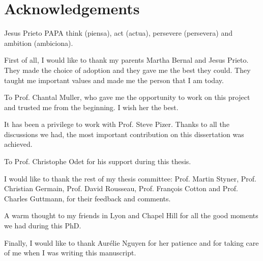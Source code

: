 \chapter*{Acknowledgements}

\begin{chapquote}{Jesus Prieto}
  PAPA think (piensa), act (actua), persevere (persevera) and ambition (ambiciona). 
\end{chapquote}

First of all, I would like to thank my parents Martha Bernal and Jesus Prieto. 
They made the choice of adoption and they gave me the best they could. 
They taught me important values and made me the person that I am today. 

To Prof. Chantal Muller, who gave me the opportunity to work 
on this project and trusted me from the beginning.
I wish her the best.

It has been a privilege to work with Prof. Steve Pizer.
Thanks to all the discussions we had, the most important contribution 
on this dissertation was achieved. 

To Prof. Christophe Odet for his support during this thesis.

I would like to thank the rest of my thesis committee: 
Prof. Martin Styner, Prof. Christian Germain, Prof. David Rousseau, Prof. Fran\c{c}ois Cotton and Prof. Charles Guttmann, 
for their feedback and comments.

A warm thought to my friends in Lyon and Chapel Hill 
for all the good moments we had during this PhD.

Finally, I would like to thank Aur\'elie Nguyen for her patience 
and for taking care of me when I was writing this manuscript.


\newpage


